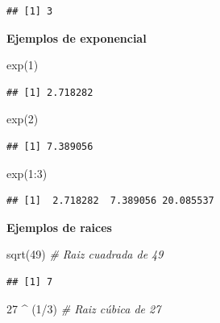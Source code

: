 \documentclass[
]{book}
\makeatletter
\newenvironment{Shaded}{\begin{snugshade}}{\end{snugshade}}
\newcommand{\CommentTok}[1]{\textcolor[rgb]{0.56,0.35,0.01}{\textit{#1}}}
\newcommand{\DecValTok}[1]{\textcolor[rgb]{0.00,0.00,0.81}{#1}}
\newcommand{\FunctionTok}[1]{\textcolor[rgb]{0.00,0.00,0.00}{#1}}
\newcommand{\NormalTok}[1]{#1}
\newcommand{\SpecialCharTok}[1]{\textcolor[rgb]{0.00,0.00,0.00}{#1}}
\newenvironment{kframe}{%
\medskip{}
\setlength{\fboxsep}{.8em}
 \def\at@end@of@kframe{}%
 \ifinner\ifhmode%
  \def\at@end@of@kframe{\end{minipage}}%
  \begin{minipage}{\columnwidth}%
 \fi\fi%
 \def\FrameCommand##1{\hskip\@totalleftmargin \hskip-\fboxsep
 \colorbox{shadecolor}{##1}\hskip-\fboxsep
     \hskip-\linewidth \hskip-\@totalleftmargin \hskip\columnwidth}%
 \MakeFramed {\advance\hsize-\width
   \@totalleftmargin\z@ \linewidth\hsize
   \@setminipage}}%
 {\par\unskip\endMakeFramed%
 \at@end@of@kframe}
\renewenvironment{Shaded}{\begin{kframe}}{\end{kframe}}
\makeatother
\begin{document}
\begin{verbatim}
## [1] 3
\end{verbatim}

\textbf{Ejemplos de exponencial}

\begin{Shaded}
\begin{Highlighting}[]
\FunctionTok{exp}\NormalTok{(}\DecValTok{1}\NormalTok{)}
\end{Highlighting}
\end{Shaded}

\begin{verbatim}
## [1] 2.718282
\end{verbatim}

\begin{Shaded}
\begin{Highlighting}[]
\FunctionTok{exp}\NormalTok{(}\DecValTok{2}\NormalTok{)}
\end{Highlighting}
\end{Shaded}

\begin{verbatim}
## [1] 7.389056
\end{verbatim}

\begin{Shaded}
\begin{Highlighting}[]
\FunctionTok{exp}\NormalTok{(}\DecValTok{1}\SpecialCharTok{:}\DecValTok{3}\NormalTok{)}
\end{Highlighting}
\end{Shaded}

\begin{verbatim}
## [1]  2.718282  7.389056 20.085537
\end{verbatim}

\textbf{Ejemplos de raices}

\begin{Shaded}
\begin{Highlighting}[]
\FunctionTok{sqrt}\NormalTok{(}\DecValTok{49}\NormalTok{)  }\CommentTok{\# Raiz cuadrada de 49}
\end{Highlighting}
\end{Shaded}

\begin{verbatim}
## [1] 7
\end{verbatim}

\begin{Shaded}
\begin{Highlighting}[]
\DecValTok{27} \SpecialCharTok{\^{}}\NormalTok{ (}\DecValTok{1}\SpecialCharTok{/}\DecValTok{3}\NormalTok{)  }\CommentTok{\# Raiz cúbica de 27}
\end{Highlighting}
\end{Shaded}
\end{document}
